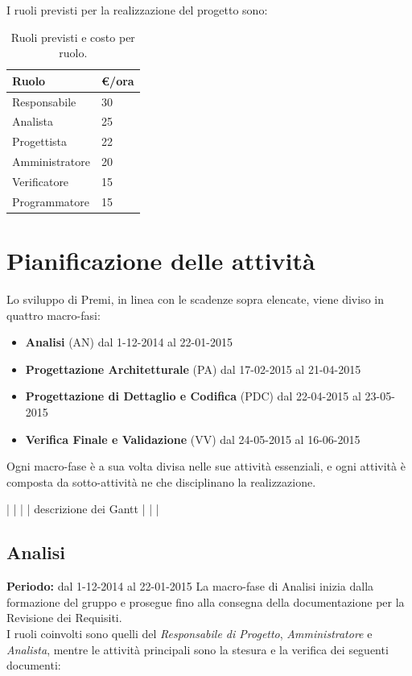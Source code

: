 I ruoli previsti per la realizzazione del progetto sono:

\begin{table}[h]
\begin{center}
\begin{tabular}{|l|l|}
\hline
\textbf{Ruolo} & \textbf{€/ora} \\
\hline
Responsabile & 30 \\
Analista & 25 \\
Progettista & 22 \\
Amministratore & 20 \\
Verificatore & 15 \\
Programmatore & 15 \\
\hline
\end{tabular}
\caption{Ruoli previsti e costo per ruolo.}
\end{center}
\end{table}

\newpage

\section{Pianificazione delle attività}
Lo sviluppo di Premi, in linea con le scadenze sopra elencate, viene diviso in quattro macro-fasi:

\begin{itemize}
\item \textbf{Analisi} (AN) dal 1-12-2014 al 22-01-2015
\item \textbf{Progettazione Architetturale} (PA) dal 17-02-2015 al 21-04-2015
\item \textbf{Progettazione di Dettaglio e Codifica} (PDC) dal 22-04-2015 al 23-05-2015
\item \textbf{Verifica Finale e Validazione} (VV) dal 24-05-2015 al 16-06-2015
\end{itemize}

Ogni macro-fase è a sua volta divisa nelle sue attività essenziali, e ogni attività è composta da sotto-attività ne che disciplinano la realizzazione.

|
|
|
|  descrizione dei Gantt
|
|
|


\subsection{Analisi}
\textbf{Periodo:} dal 1-12-2014 al 22-01-2015
La macro-fase di Analisi inizia dalla formazione del gruppo e prosegue fino alla consegna della documentazione per la Revisione dei Requisiti. \\
I ruoli coinvolti sono quelli del \textit{Responsabile di Progetto}, \textit{Amministratore} e \textit{Analista}, mentre le attività principali sono la stesura e la verifica dei seguenti documenti:

